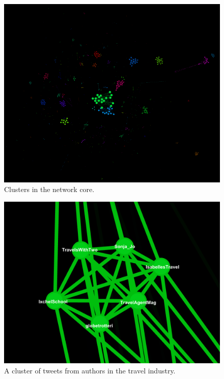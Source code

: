 \documentclass[a4paper, 11pt, titlepage]{article}
\begin{document}
\begin{figure}[h]
\centering
\label{fig:rt_net_core_clusters}
\includegraphics[width=120mm]{../figures/rt_net_core_clusters}
\caption{Clusters in the network core.}
\end{figure}

\begin{figure}[h]
\centering
\label{fig:rt_net_travel}
\includegraphics[width=120mm]{../figures/rt_net_travel}
\caption{A cluster of tweets from authors in the travel industry.}
\end{figure}
\end{document}
